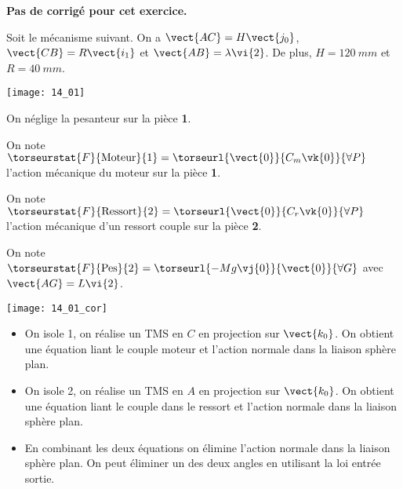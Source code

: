 \normalfalse \difficiletrue \tdifficilefalse
\correctiontrue


\setcounter{numques}{0}
\ifcorrection
\else
\textbf{Pas de corrigé pour cet exercice.}
\fi

\ifprof
\else
Soit le mécanisme suivant. On a $\vect{AC}=H\vect{j_0}$,  $\vect{CB}=R\vect{i_1}$ et $\vect{AB} = \lambda\vi{2}$. De plus, 
$H=\SI{120}{mm}$ et $R=\SI{40}{mm}$. 

\begin{center}
\texttt{[image: 14\_01]}
\end{center}
\fi

On néglige la pesanteur sur la pièce \textbf{1}. 

On note $\torseurstat{F}{\text{Moteur}}{1} = \torseurl{\vect{0}}{C_m\vk{0}}{\forall P}$ l'action mécanique du moteur sur la pièce \textbf{1}.

On note $\torseurstat{F}{\text{Ressort}}{2} = \torseurl{\vect{0}}{C_r\vk{0}}{\forall P}$ l'action mécanique d'un ressort couple sur la pièce \textbf{2}. 

On note $\torseurstat{F}{\text{Pes}}{2} = \torseurl{-Mg\vj{0}}{\vect{0}}{\forall G}$ avec $\vect{AG}=L\vi{2}$. 

\ifprof
\begin{center}
\texttt{[image: 14\_01\_cor]}
\end{center}
\else
\fi

\ifprof
\begin{itemize}
\item On isole 1, on réalise un TMS en $C$ en projection sur $\vect{k_0}$. On obtient une équation liant le couple moteur et l'action normale dans la liaison sphère plan. 
\item On isole 2, on réalise un TMS en $A$ en projection sur $\vect{k_0}$. On obtient une équation liant le couple dans le ressort et l'action normale dans la liaison sphère plan. 
\item En combinant les deux équations on élimine l'action normale dans la liaison sphère plan. On peut éliminer un des deux angles en utilisant la loi entrée sortie.
\end{itemize}
\else
\fi


